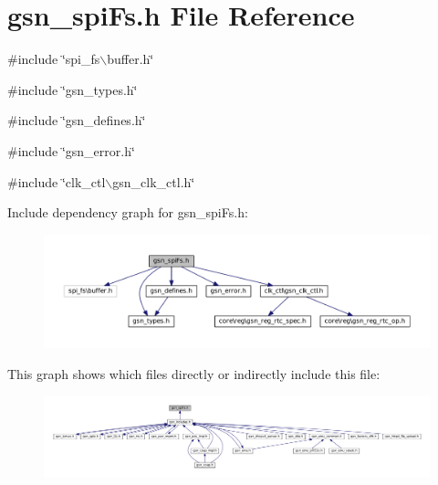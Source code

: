\hypertarget{a00589}{
\section{gsn\_\-spiFs.h File Reference}
\label{a00589}
}
{\ttfamily \#include \char`\"{}spi\_\-fs$\backslash$buffer.h\char`\"{}}\par
{\ttfamily \#include \char`\"{}gsn\_\-types.h\char`\"{}}\par
{\ttfamily \#include \char`\"{}gsn\_\-defines.h\char`\"{}}\par
{\ttfamily \#include \char`\"{}gsn\_\-error.h\char`\"{}}\par
{\ttfamily \#include \char`\"{}clk\_\-ctl$\backslash$gsn\_\-clk\_\-ctl.h\char`\"{}}\par
Include dependency graph for gsn\_\-spiFs.h:
\nopagebreak
\begin{figure}[H]
\begin{center}
\leavevmode
\includegraphics[width=400pt]{a00830}
\end{center}
\end{figure}
This graph shows which files directly or indirectly include this file:
\nopagebreak
\begin{figure}[H]
\begin{center}
\leavevmode
\includegraphics[width=400pt]{a00831}
\end{center}
\end{figure}
